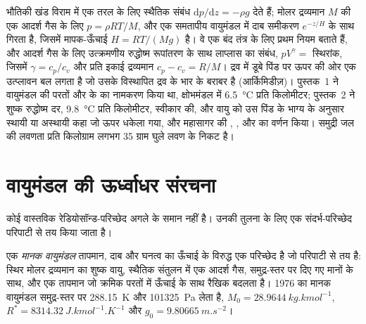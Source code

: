\begin{recall}
भौतिकी खंड विराम में एक तरल के लिए स्थैतिक संबंध $\mathrm dp/\mathrm dz =
-\rho g$ देते हैं; मोलर द्रव्यमान $M$ की एक आदर्श गैस के लिए $p = \rho R
T/M$, और एक समतापीय वायुमंडल में दाब समीकरण $e^{-z/H}$ के साथ गिरता है, जिसमें मापक-ऊँचाई $H = RT/(Mg)$ है। वे एक बंद तंत्र के लिए प्रथम नियम बताते हैं, और आदर्श गैस के लिए उत्क्रमणीय रुद्धोष्म रूपांतरण के साथ लाप्लास का संबंध, $pV^{\gamma} = $ स्थिरांक, जिसमें $\gamma = c_p/c_v$ और प्रति इकाई द्रव्यमान $c_p - c_v
= R/M$। द्रव में डूबे पिंड पर ऊपर की ओर एक उत्प्लावन बल लगता है जो उसके विस्थापित द्रव के भार के बराबर है (आर्किमिडीज़)। पुस्तक~1 ने वायुमंडल की परतों और  के  का नामकरण किया था, क्षोभमंडल में \qty{6.5}{\celsius} प्रति किलोमीटर; पुस्तक~2 ने शुष्क रुद्धोष्म दर, \qty{9.8}{\celsius} प्रति किलोमीटर, स्वीकार की, और वायु को उस पिंड के भाग्य के अनुसार स्थायी या अस्थायी कहा जो ऊपर धकेला गया, और महासागर की , ,  और  का वर्णन किया। समुद्री जल की लवणता प्रति किलोग्राम लगभग 35 ग्राम घुले लवण के निकट है।
\end{recall}

\section{वायुमंडल की ऊर्ध्वाधर संरचना}\label{sec:b1:fluid-envelopes-structure:atmosphere}

कोई वास्तविक रेडियोसॉन्ड-परिच्छेद अगले के समान नहीं है। उनकी तुलना के लिए एक संदर्भ-परिच्छेद परिपाटी से तय किया जाता है।

\begin{definition}[मानक वायुमंडल]\label{def:b1:fluid-envelopes-structure:standard-atmosphere}
एक \emph{मानक वायुमंडल} तापमान, दाब और घनत्व का ऊँचाई के विरुद्ध एक परिच्छेद है जो परिपाटी से तय है: स्थिर मोलर द्रव्यमान का शुष्क वायु, स्थैतिक संतुलन में एक आदर्श गैस, समुद्र-स्तर पर दिए गए मानों के साथ, और एक तापमान जो क्रमिक परतों में ऊँचाई के साथ रैखिक बदलता है। 1976 का मानक वायुमंडल समुद्र-स्तर पर \qty{288.15}{K} और \qty{101325}{Pa} लेता है, $M_0 = \qty{28.9644}{kg.kmol^{-1}}$, $R^* = \qty{8314.32}{J.kmol^{-1}.K^{-1}}$ और $g_0 = \qty{9.80665}{m.s^{-2}}$।
\end{definition}

